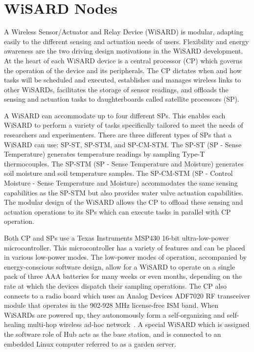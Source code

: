 \section{WiSARD Nodes}
A Wireless Sensor/Actuator and Relay Device (WiSARD) is  modular, adapting easily to the different sensing and actuation needs of users. Flexibility and energy awareness are the two driving design motivations in the WiSARD development. At the heart of each WiSARD device is a central processor (CP) which governs the operation of the device and its peripherals. The CP dictates when and how tasks will be scheduled and executed, establishes and manages wireless links to other WiSARDs, facilitates the storage of sensor readings, and offloads the sensing and actuation tasks to daughterboards called satellite processors (SP).

A WiSARD can accommodate up to four different SPs. This enables each WiSARD to perform a variety of tasks specifically tailored to meet the needs of researchers and experimenters. There are three different types of SPs that a WiSARD can use: SP-ST, SP-STM, and SP-CM-STM. The SP-ST (SP - Sense Temperature) generates temperature readings by sampling Type-T thermocouples. The SP-STM (SP - Sense Temperature and Moisture) generates soil moisture and soil temperature samples. The SP-CM-STM (SP - Control Moisture - Sense Temperature and Moisture) accommodates the same sensing capabilities as the SP-STM but also provides water valve actuation capabilities. The modular design of the WiSARD allows the CP to offload these sensing and actuation operations to its SPs which can execute tasks in parallel with CP operation.

Both CP and SPs use a Texas Instruments MSP430 16-bit ultra-low-power microcontroller. This microcontroller has a variety of features and can be placed in various low-power modes. The low-power modes of operation, accompanied by energy-conscious software design, allow for a WiSARD to operate on a single pack of three AAA batteries for many weeks or even months, depending on the rate at which the devices dispatch their sampling operations. The CP also connects to a radio board which uses an Analog Devices ADF7020 RF transceiver module that operates in the 902-928 MHz license-free ISM band.  When WiSARDs are powered up, they autonomously form a self-organizing and self-healing multi-hop wireless ad-hoc network~\cite{Flikkema}. A special WiSARD which is assigned the software role of Hub acts as the base station, and is connected to an embedded Linux computer referred to as a garden server. 

